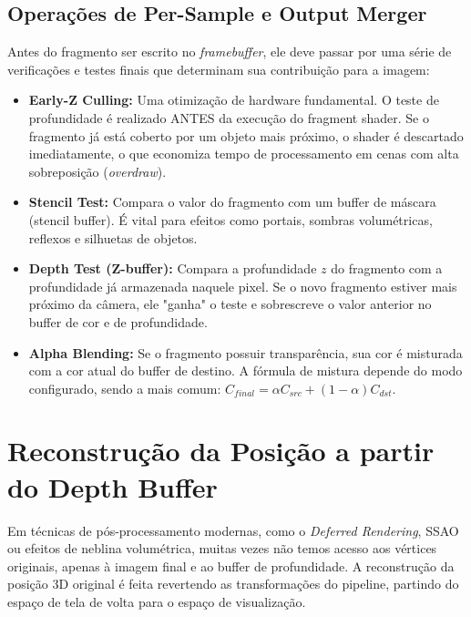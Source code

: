 \subsection{Operações de Per-Sample e Output Merger}

Antes do fragmento ser escrito no \textit{framebuffer}, ele deve passar por uma série de verificações e testes finais que determinam sua contribuição para a imagem:

\begin{itemize}
    \item \textbf{Early-Z Culling:} Uma otimização de hardware fundamental. O teste de profundidade é realizado ANTES da execução do fragment shader. Se o fragmento já está coberto por um objeto mais próximo, o shader é descartado imediatamente, o que economiza tempo de processamento em cenas com alta sobreposição (\textit{overdraw}).
    \item \textbf{Stencil Test:} Compara o valor do fragmento com um buffer de máscara (stencil buffer). É vital para efeitos como portais, sombras volumétricas, reflexos e silhuetas de objetos.
    \item \textbf{Depth Test (Z-buffer):} Compara a profundidade $z$ do fragmento com a profundidade já armazenada naquele pixel. Se o novo fragmento estiver mais próximo da câmera, ele "ganha" o teste e sobrescreve o valor anterior no buffer de cor e de profundidade.
    \item \textbf{Alpha Blending:} Se o fragmento possuir transparência, sua cor é misturada com a cor atual do buffer de destino. A fórmula de mistura depende do modo configurado, sendo a mais comum: $C_{final} = \alpha C_{src} + (1-\alpha) C_{dst}$.
\end{itemize}

\section{Reconstrução da Posição a partir do Depth Buffer}

Em técnicas de pós-processamento modernas, como o \textit{Deferred Rendering}, SSAO ou efeitos de neblina volumétrica, muitas vezes não temos acesso aos vértices originais, apenas à imagem final e ao buffer de profundidade. A reconstrução da posição 3D original é feita revertendo as transformações do pipeline, partindo do espaço de tela de volta para o espaço de visualização.

